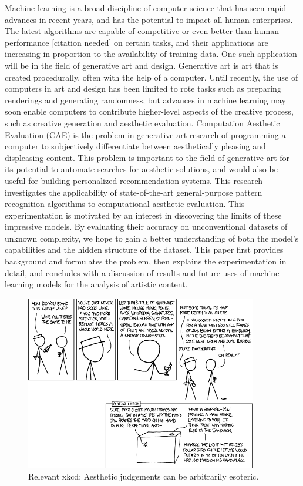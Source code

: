 \documentclass[midd]{thesis}
\begin{document}
Machine learning is a broad discipline of computer science that has seen rapid advances in recent years, and has the potential to impact all human enterprises. The latest algorithms are capable of competitive or even better-than-human performance [citation needed] on certain tasks, and their applications are increasing in proportion to the availability of training data. One such application will be in the field of generative art and design. Generative art is art that is created procedurally, often with the help of a computer. Until recently, the use of computers in art and design has been limited to rote tasks such as preparing renderings and generating randomness, but advances in machine learning may soon enable computers to contribute higher-level aspects of the creative process, such as creative generation and aesthetic evaluation. Computation Aesthetic Evaluation (CAE) is the problem in generative art research of programming a computer to subjectively differentiate between aesthetically pleasing and displeasing content. This problem is important to the field of generative art for its potential to automate searches for aesthetic solutions, and would also be useful for building personalized recommendation systems. This research investigates the applicability of state-of-the-art general-purpose pattern recognition algorithms to computational aesthetic evaluation. This experimentation is motivated by an interest in discovering the limits of these impressive models. By evaluating their accuracy on unconventional datasets of unknown complexity, we hope to gain a better understanding of both the model's capabilities and the hidden structure of the dataset. This paper first provides background and formulates the problem, then explains the experimentation in detail, and concludes with a discussion of results and future uses of machine learning models for the analysis of artistic content.

\begin{figure}
\centering
\includegraphics[width=0.9\textwidth]{visualizations/connoisseur.png}
\caption{Relevant xkcd: Aesthetic judgements can be arbitrarily esoteric.}
\label{fig:effectivecomplexity}
\end{figure}
\end{document}
